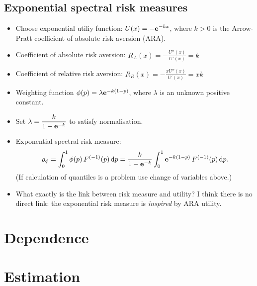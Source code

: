 \documentclass[square]{article} %
\theoremstyle{plain}
\theoremstyle{definition} %
\begin{document}
\subsection{Exponential spectral risk measures}
\label{sec:expon-risk-meas}

\begin{itemize}
\item Choose exponential utiliy function:
  $\displaystyle U(x) = -{\bf e}^{-k x}$, where $k>0$ is the Arrow-Pratt
  coefficient of absolute risk aversion
  (ARA).
\item Coefficient of absolute risk aversion: $\displaystyle R_A(x) =
  -\frac{U''(x)}{U'(x)} = k$
\item Coefficient of relative risk aversion: $\displaystyle R_R(x) = -
  \frac{x U''(x)}{U'(x)} = xk$
\item Weighting function $\phi(p) = \lambda {\bf e}^{-k(1-p)}$, where
  $\lambda$ is an unknown positive constant.
\item Set $\displaystyle\lambda = \frac{k}{1-{\bf e}^{-k}}$ to satisfy
  normalisation.
\item Exponential spectral risk measure:
  \begin{equation*}
    \rho_{\phi} = \int_0^1 \phi(p)\, F^{(-1)}(p)\, {\rm d} p =
    \frac{k}{1-{\bf e}^{-k}} \int_0^1 {\bf e}^{-k(1-p)}\, F^{(-1)}(p)\, {\rm d} p. 
  \end{equation*}
(If calculation of quantiles is a problem use change of variables
above.)
\item What exactly is the link between risk measure and utility?
    I think there is no direct link: the exponential risk measure is
   {\em inspired\/} by ARA utility.
\end{itemize}




\section{Dependence}
\label{sec:dependence}


\newpage
\section{Estimation}



\newpage
\end{document}

